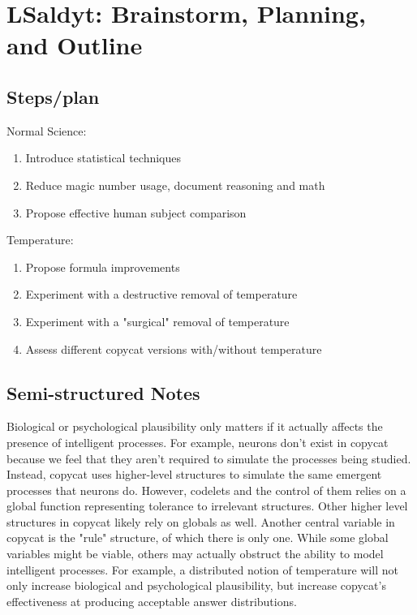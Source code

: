 
\section{LSaldyt: Brainstorm, Planning, and Outline}

\subsection{Steps/plan}

Normal Science:
\begin{enumerate}
	\item Introduce statistical techniques
    \item Reduce magic number usage, document reasoning and math
    \item Propose effective human subject comparison
\end{enumerate}
Temperature:
\begin{enumerate}
	\item Propose formula improvements
    \item Experiment with a destructive removal of temperature
    \item Experiment with a "surgical" removal of temperature
    \item Assess different copycat versions with/without temperature
\end{enumerate}

\subsection{Semi-structured Notes}

Biological or psychological plausibility only matters if it actually affects the presence of intelligent processes. For example, neurons don't exist in copycat because we feel that they aren't required to simulate the processes being studied. Instead, copycat uses higher-level structures to simulate the same emergent processes that neurons do. However, codelets and the control of them relies on a global function representing tolerance to irrelevant structures. Other higher level structures in copycat likely rely on globals as well. Another central variable in copycat is the "rule" structure, of which there is only one. While some global variables might be viable, others may actually obstruct the ability to model intelligent processes. For example, a distributed notion of temperature will not only increase biological and psychological plausibility, but increase copycat's effectiveness at producing acceptable answer distributions.

